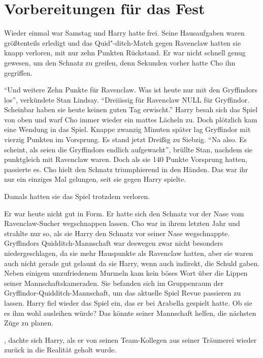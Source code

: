 \chapter{Vorbereitungen für das Fest}


Wieder einmal war Samstag und Harry hatte frei. Seine Hausaufgaben waren größtenteils erledigt und das Quid"-ditch-Match gegen Ravenclaw hatten sie knapp verloren, mit nur zehn Punkten Rückstand. Er war nicht schnell genug gewesen, um den Schnatz zu greifen, denn Sekunden vorher hatte Cho ihn gegriffen.

\begin{rueckblick}
\enquote{Und weitere Zehn Punkte für Ravenclaw. Was ist heute nur mit den Gryffindors los}, verkündete Stan Lindsay. \enquote{Dreiiissig für Ravenclaw NULL für Gryffindor. Scheinbar haben sie heute keinen guten Tag erwischt.} Harry besah sich das Spiel von oben und warf Cho immer wieder ein mattes Lächeln zu. Doch plötzlich kam eine Wendung in das Spiel. Knappe zwanzig Minuten später lag Gryffindor mit vierzig Punkten im Vorsprung. Es stand jetzt Dreißig zu Siebzig. \enquote{Na also. Es scheint, als seien die Gryffindors endlich aufgewacht}, brüllte Stan, nachdem sie punktgleich mit Ravenclaw waren. Doch als sie 140 Punkte Vorsprung hatten, passierte es. Cho hielt den Schnatz triumphierend in den Händen. Das war ihr nur ein einziges Mal gelungen, seit sie gegen Harry spielte.
\end{rueckblick}

Damals hatten sie das Spiel trotzdem verloren.

Er war heute nicht gut in Form. Er hatte sich den Schnatz vor der Nase vom Ravenclaw-Sucher wegschnappen lassen. Cho war in ihrem letzten Jahr und strahlte nur so, als sie Harry den Schnatz vor seiner Nase wegschnappte. Gryffindors Quidditch-Mannschaft war deswegen zwar nicht besonders niedergeschlagen, da sie mehr Hauspunkte als Ravenclaw hatten, aber sie waren auch nicht gerade gut gelaunt da sie Harry, wenn auch indirekt, die Schuld gaben. Neben einigem unzufriedenem Murmeln kam kein böses Wort über die Lippen seiner Mannschaftskameraden. Sie befanden sich im Gruppenraum der Gryf\-fin\-dor-Quidditch-Mann\-schaft, um das aktuelle Spiel Revue passieren zu lassen. Harry fiel wieder das Spiel ein, das er bei Arabella gespielt hatte. Ob sie es ihm wohl ausleihen würde? Das könnte seiner Mannschaft helfen, die nächsten Züge zu planen.

, dachte sich Harry, als er von seinen Team-Kollegen aus seiner Träumerei wieder zurück in die Realität geholt wurde.


